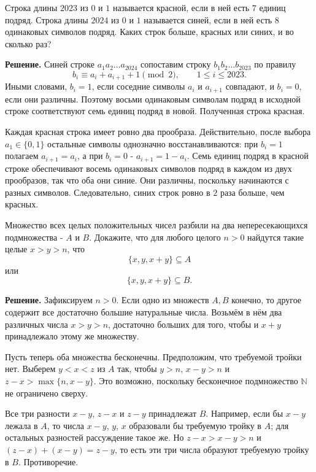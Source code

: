 \begin{problems}
\item Строка длины $2023$ из $0$ и $1$ называется красной, если в ней есть $7$ единиц подряд. Строка длины $2024$ из $0$ и $1$ называется синей, если в ней есть $8$ одинаковых символов подряд. Каких строк больше, красных или синих, и во сколько раз?
\par\smallskip\noindent\textbf{Решение.} Синей строке $a_1a_2\ldots a_{2024}$ сопоставим строку $b_1b_2\ldots b_{2023}$ по правилу
\[
b_i\equiv a_i+a_{i+1}+1\pmod 2,\qquad 1\le i\le2023.
\]
Иными словами, $b_i=1$, если соседние символы $a_i$ и $a_{i+1}$ совпадают, и $b_i=0$, если они различны. Поэтому восьми одинаковым символам подряд в исходной строке соответствуют семь единиц подряд в новой. Полученная строка красная.
\par Каждая красная строка имеет ровно два прообраза. Действительно, после выбора $a_1\in\{0,1\}$ остальные символы однозначно восстанавливаются: при $b_i=1$ полагаем $a_{i+1}=a_i$, а при $b_i=0$ - $a_{i+1}=1-a_i$. Семь единиц подряд в красной строке обеспечивают восемь одинаковых символов подряд в каждом из двух прообразов, так что оба они синие. Они различны, поскольку начинаются с разных символов. Следовательно, синих строк ровно в $2$ раза больше, чем красных.\par

\item Множество всех целых положительных чисел разбили на два непересекающихся подмножества - $A$ и $B$. Докажите, что для любого целого $n>0$ найдутся такие целые $x>y>n$, что
\[
\{x,y,x+y\}\subseteq A
\]
или
\[
\{x,y,x+y\}\subseteq B.
\]
\par\smallskip\noindent\textbf{Решение.} Зафиксируем $n>0$. Если одно из множеств $A,B$ конечно, то другое содержит все достаточно большие натуральные числа. Возьмём в нём два различных числа $x>y>n$, достаточно больших для того, чтобы и $x+y$ принадлежало этому же множеству.
\par Пусть теперь оба множества бесконечны. Предположим, что требуемой тройки нет. Выберем $y<x<z$ из $A$ так, чтобы $y>n$, $x-y>n$ и $z-x>\max\{n,x-y\}$. Это возможно, поскольку бесконечное подмножество $\mathbb N$ не ограничено сверху.
\par Все три разности $x-y$, $z-x$ и $z-y$ принадлежат $B$. Например, если бы $x-y$ лежала в $A$, то числа $x-y$, $y$, $x$ образовали бы требуемую тройку в $A$; для остальных разностей рассуждение такое же. Но $z-x>x-y>n$ и $(z-x)+(x-y)=z-y$, то есть эти три числа образуют требуемую тройку в $B$. Противоречие.\par


\end{problems}
